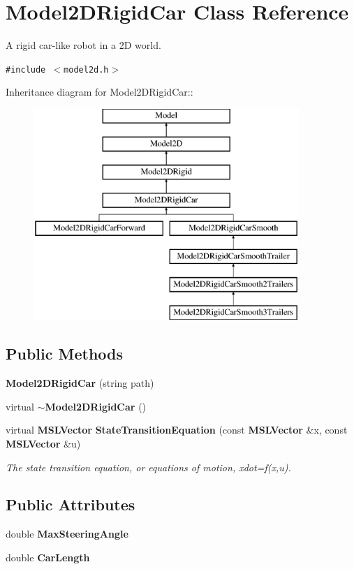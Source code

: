 \section{Model2DRigid\-Car  Class Reference}
\label{class_Model2DRigidCar}
A rigid car-like robot in a 2D world. 


{\tt \#include $<$model2d.h$>$}

Inheritance diagram for Model2DRigid\-Car::\begin{figure}[H]
\begin{center}
\leavevmode
\includegraphics[height=8cm]{class_Model2DRigidCar}
\end{center}
\end{figure}
\subsection*{Public Methods}
\begin{CompactItemize}
\item 
{\bf Model2DRigid\-Car} (string path)
\item 
virtual {\bf $\sim$Model2DRigid\-Car} ()
\item 
virtual {\bf MSLVector} {\bf State\-Transition\-Equation} (const {\bf MSLVector} \&x, const {\bf MSLVector} \&u)
\begin{CompactList}\small\item\em The state transition equation, or equations of motion, xdot=f(x,u).\item\end{CompactList}\end{CompactItemize}
\subsection*{Public Attributes}
\begin{CompactItemize}
\item 
double {\bf Max\-Steering\-Angle}
\item 
double {\bf Car\-Length}
\end{CompactItemize}


